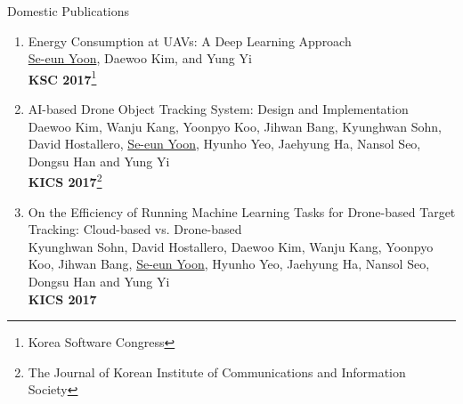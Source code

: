 \documentclass{resume} %
\begin{document}
\begin{rSection}{Domestic Publications}
	\begin{enumerate}
	\item Energy Consumption at UAVs: A Deep Learning Approach\\
	\underline{Se-eun Yoon}, Daewoo Kim, and Yung Yi\\
	\textbf{KSC 2017}\footnote{Korea Software Congress}
	
	\item AI-based Drone Object Tracking System: Design and Implementation\\
	Daewoo Kim, Wanju Kang, Yoonpyo Koo, Jihwan Bang, Kyunghwan Sohn, David Hostallero, \underline{Se-eun Yoon}, Hyunho Yeo, Jaehyung Ha, Nansol Seo, Dongsu Han and Yung Yi\\
	\textbf{KICS 2017}\footnote{The Journal of Korean Institute of Communications and Information Society}
	
	\item On the Efficiency of Running Machine Learning Tasks for Drone-based Target Tracking: Cloud-based vs. Drone-based\\
	Kyunghwan Sohn, David Hostallero, Daewoo Kim, Wanju Kang, Yoonpyo Koo, Jihwan Bang, \underline{Se-eun Yoon}, Hyunho Yeo, Jaehyung Ha, Nansol Seo, Dongsu Han and Yung Yi\\
	\textbf{KICS 2017}
\end{enumerate}

\end{rSection}


\end{document}
